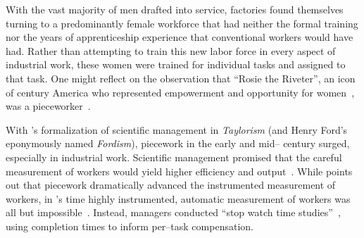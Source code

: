 \documentclass[trackingWork]{subfiles}
\begin{document}
With the vast majority of men drafted into service,
factories found themselves turning to
a predominantly female workforce that had neither
the formal training nor
the years of apprenticeship experience
that conventional workers would have had.
Rather than attempting to train this new labor force in every aspect of industrial work,
these women were trained for individual tasks
and assigned to that task. %
One might reflect on the observation that ``Rosie the Riveter'',
an icon of  century America who
represented empowerment and opportunity for women~\cite{honey1985creating},
was a pieceworker~\cite{davies2014origins}.


{With \citeauthor{taylor1914principles}'s formalization of scientific management in \textit{Taylorism}
(and Henry Ford's eponymously named \textit{Fordism}),
piecework in the early and mid-- century surged, especially in industrial work.}
Scientific management promised that the careful measurement of workers would yield
higher efficiency and output~\cite{taylor1914principles,towardsGlobalFordism}.
While \citeauthor{Brown01041990} points out that
piecework dramatically advanced the instrumented measurement of workers,
in \citeauthor{taylor1914principles}'s time highly instrumented,
automatic measurement of workers was all but impossible~\cite{Brown01041990}.
Instead, managers conducted ``stop watch time studies''~\cite{nadworny1955scientific},
using completion times to inform per--task compensation.
\end{document}
